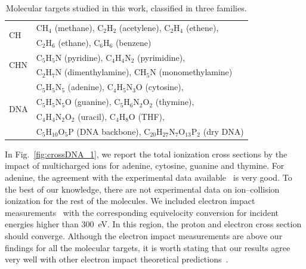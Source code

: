 \documentclass[preprint]{revtex4-2}
\begin{document}
\begin{table}[H]
\begin{center}
\begin{tabular}{|p{}|p{}|}
\hline
\multirow{2}{*}{CH} 
      & CH$_4$ (methane), C$_2$H$_2$ (acetylene), C$_2$H$_4$ (ethene), \\
      & C$_2$H$_6$ (ethane), C$_6$H$_6$ (benzene) \\
\hline
\multirow{2}{*}{CHN} 
      & C$_5$H$_5$N (pyridine), C$_4$H$_4$N$_2$ (pyrimidine), \\ 
      & C$_2$H$_7$N (dimenthylamine), CH$_5$N (monomethylamine) \\
\hline
\multirow{4}{*}{DNA} 
      & C$_5$H$_5$N$_5$ (adenine), C$_4$H$_5$N$_3$O (cytosine), \\
      & C$_5$H$_5$N$_5$O (guanine), C$_5$H$_6$N$_2$O$_2$ (thymine), \\
      & C$_4$H$_4$N$_2$O$_2$ (uracil), C$_4$H$_8$O (THF), \\
      & C$_5$H$_{10}$O$_5$P (DNA backbone), 
        C$_{20}$H$_{27}$N$_7$O$_{13}$P$_2$ 
(dry DNA) \\
\hline
\end{tabular}
\caption{Molecular targets studied in this work, classified in three 
families.}
\label{tab:families}
\end{center}
\end{table}

In Fig.~\ref{fig:crossDNA_1}, we report the total ionization cross 
sections by the impact of multicharged ions for adenine, cytosine, 
guanine and thymine. For adenine, the agreement with the experimental 
data available~\cite{iriki2011} is very good. To the best of our 
knowledge, there are not experimental data on ion--collision ionization 
for the rest of the molecules. We included electron impact 
measurements~\cite{rahman2016} with the corresponding equivelocity 
conversion for incident energies higher than 300~eV. In this region, 
the proton and electron cross section should converge. Although the 
electron impact measurements are above our findings for all the 
molecular targets, it is worth stating that our results agree very well 
with other electron impact theoretical 
predictions~\cite{mozejko2003,tan2018}. 
\end{document}
